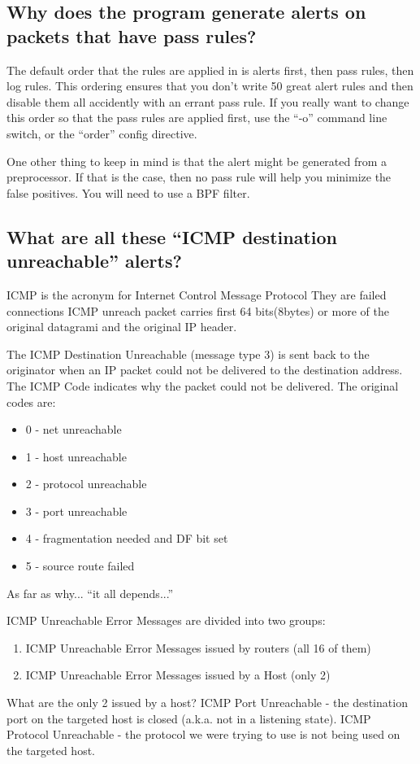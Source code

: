 \documentclass{article}
\begin{document}
\subsection{Why does the program generate alerts on packets that have pass rules?  }

The default order that the rules are applied in is alerts first, then pass
rules, then log rules. This ordering ensures that you don't write 50 great
alert rules and then disable them all accidently with an errant pass rule. If
you really want to change this order so that the pass rules are applied first,
use the ``-o'' command line switch, or the ``order'' config directive.

One other thing to keep in mind is that the alert might be generated from a
preprocessor. If that is the case, then no pass rule will help you minimize the
false positives. You will need to use a BPF filter. 

\subsection{What are all these ``ICMP destination unreachable'' alerts? }

ICMP is the acronym for Internet Control Message Protocol
They are failed connections ICMP unreach packet carries first 64
bits(8bytes) or more of the original datagrami and the original IP header.

The ICMP Destination Unreachable (message type 3) is sent back to the
originator when an IP packet could not be delivered to the destination
address.  The ICMP Code indicates why the packet could not be delivered.
The original codes are:

\begin{itemize}
\item0 - net unreachable
\item1 - host unreachable
\item2 - protocol unreachable
\item3 - port unreachable
\item4 - fragmentation needed and DF bit set
\item5 - source route failed
\end{itemize}

As far as why... ``it all depends...''

ICMP Unreachable Error Messages are divided into two groups:
\begin{enumerate}
\item ICMP Unreachable Error Messages issued by routers (all 16 of them)
\item  ICMP Unreachable Error Messages issued by a Host (only 2)
\end{enumerate}

What are the only 2 issued by a host?
ICMP Port Unreachable - the destination port on the targeted host is
                        closed (a.k.a. not in a listening state).
ICMP Protocol Unreachable - the protocol we were trying to use is not
                        being used on the targeted host.
\end{document}
